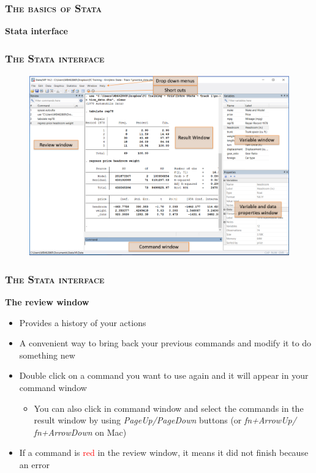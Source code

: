 \documentclass[10pt]{beamer}
\begin{document}
	\begin{frame}
		\frametitle{\textsc{The basics of Stata}}
		\begin{center}
			\textbf{Stata interface}
		\end{center}
	\end{frame}
		
		
	\begin{frame}
		\frametitle{\textsc{The Stata interface}}
		
		\begin{figure}[H] 
		\centering
		\includegraphics[width=0.9\linewidth]{stata_interface}
		\end{figure}
	\end{frame}

	\begin{frame}

		\frametitle{\textsc{The Stata interface}}
			\begin{center}
				\textbf{The review window} 
			\end{center}
		\begin{itemize}
			\item  Provides a history of your actions
			\item  A convenient way to bring back your previous commands and modify it to do something new
			\item Double click on a command you want to use again and it will appear in your command window
			\begin{itemize}
				\item You can also click in command window and select the commands in the result window by using \textit{PageUp/PageDown} buttons (or \textit{fn+ArrowUp/ fn+ArrowDown} on Mac)
			\end{itemize}
			\item If a command is \textcolor{red}{red} in the review window, it means it did not finish because an error
		\end{itemize}
	\end{frame}
\end{document}
